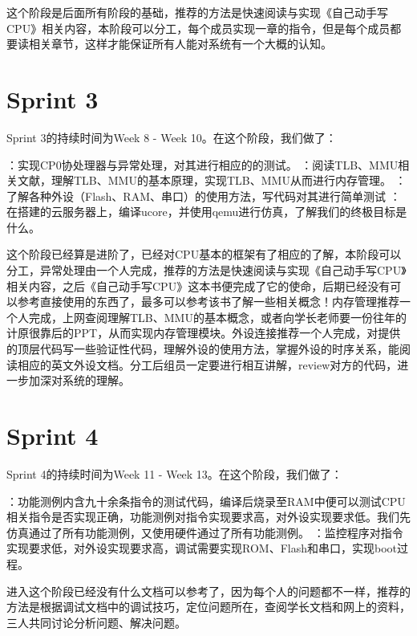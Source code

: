 这个阶段是后面所有阶段的基础，推荐的方法是快速阅读与实现《自己动手写CPU》相关内容，本阶段可以分工，每个成员实现一章的指令，但是每个成员都要读相关章节，这样才能保证所有人能对系统有一个大概的认知。

\section{Sprint 3}

Sprint 3的持续时间为Week 8 - Week 10。在这个阶段，我们做了：
    
    \begin{enumerate}
        ：实现CP0协处理器与异常处理，对其进行相应的的测试。
        ：阅读TLB、MMU相关文献，理解TLB、MMU的基本原理，实现TLB、MMU从而进行内存管理。
        ：了解各种外设（Flash、RAM、串口）的使用方法，写代码对其进行简单测试
        ：在搭建的云服务器上，编译ucore，并使用qemu进行仿真，了解我们的终极目标是什么。
    \end{enumerate}

这个阶段已经算是进阶了，已经对CPU基本的框架有了相应的了解，本阶段可以分工，异常处理由一个人完成，推荐的方法是快速阅读与实现《自己动手写CPU》相关内容，之后《自己动手写CPU》这本书便完成了它的使命，后期已经没有可以参考直接使用的东西了，最多可以参考该书了解一些相关概念！内存管理推荐一个人完成，上网查阅理解TLB、MMU的基本概念，或者向学长老师要一份往年的计原很靠后的PPT，从而实现内存管理模块。外设连接推荐一个人完成，对提供的顶层代码写一些验证性代码，理解外设的使用方法，掌握外设的时序关系，能阅读相应的英文外设文档。分工后组员一定要进行相互讲解，review对方的代码，进一步加深对系统的理解。

\section{Sprint 4}

Sprint 4的持续时间为Week 11 - Week 13。在这个阶段，我们做了：
    
    \begin{enumerate}
        ：功能测例内含九十余条指令的测试代码，编译后烧录至RAM中便可以测试CPU相关指令是否实现正确，功能测例对指令实现要求高，对外设实现要求低。我们先仿真通过了所有功能测例，又使用硬件通过了所有功能测例。
        ：监控程序对指令实现要求低，对外设实现要求高，调试需要实现ROM、Flash和串口，实现boot过程。
    \end{enumerate}

进入这个阶段已经没有什么文档可以参考了，因为每个人的问题都不一样，推荐的方法是根据调试文档中的调试技巧，定位问题所在，查阅学长文档和网上的资料，三人共同讨论分析问题、解决问题。

